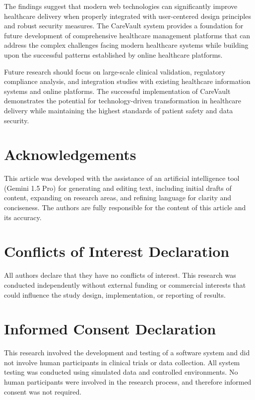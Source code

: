 \documentclass[12pt,a4paper]{article}
\begin{document}
The findings suggest that modern web technologies can significantly improve healthcare delivery when properly integrated with user-centered design principles and robust security measures. The CareVault system provides a foundation for future development of comprehensive healthcare management platforms that can address the complex challenges facing modern healthcare systems while building upon the successful patterns established by online healthcare platforms.

Future research should focus on large-scale clinical validation, regulatory compliance analysis, and integration studies with existing healthcare information systems and online platforms. The successful implementation of CareVault demonstrates the potential for technology-driven transformation in healthcare delivery while maintaining the highest standards of patient safety and data security.

\section{Acknowledgements}

This article was developed with the assistance of an artificial intelligence tool (Gemini 1.5 Pro) for generating and editing text, including initial drafts of content, expanding on research areas, and refining language for clarity and conciseness. The authors are fully responsible for the content of this article and its accuracy.

\section{Conflicts of Interest Declaration}

All authors declare that they have no conflicts of interest. This research was conducted independently without external funding or commercial interests that could influence the study design, implementation, or reporting of results.

\section{Informed Consent Declaration}

This research involved the development and testing of a software system and did not involve human participants in clinical trials or data collection. All system testing was conducted using simulated data and controlled environments. No human participants were involved in the research process, and therefore informed consent was not required.
\end{document}
